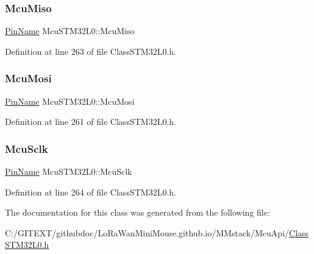 \subsubsection{\texorpdfstring{Mcu\+Miso}{McuMiso}}
{\footnotesize\ttfamily \mbox{\hyperlink{_class_s_t_m32_l0_8h_a5ceb873075d76667eb54dc6a7d2734d1}{Pin\+Name}} Mcu\+S\+T\+M32\+L0\+::\+Mcu\+Miso}



Definition at line 263 of file Class\+S\+T\+M32\+L0.\+h.

\mbox{\label{class_mcu_s_t_m32_l0_ae51c54974f7c9805c92b303a56af819d}} 
\subsubsection{\texorpdfstring{Mcu\+Mosi}{McuMosi}}
{\footnotesize\ttfamily \mbox{\hyperlink{_class_s_t_m32_l0_8h_a5ceb873075d76667eb54dc6a7d2734d1}{Pin\+Name}} Mcu\+S\+T\+M32\+L0\+::\+Mcu\+Mosi}



Definition at line 261 of file Class\+S\+T\+M32\+L0.\+h.

\mbox{\label{class_mcu_s_t_m32_l0_a4162e63da5dfca06d192ee811157be3c}} 
\subsubsection{\texorpdfstring{Mcu\+Sclk}{McuSclk}}
{\footnotesize\ttfamily \mbox{\hyperlink{_class_s_t_m32_l0_8h_a5ceb873075d76667eb54dc6a7d2734d1}{Pin\+Name}} Mcu\+S\+T\+M32\+L0\+::\+Mcu\+Sclk}



Definition at line 264 of file Class\+S\+T\+M32\+L0.\+h.



The documentation for this class was generated from the following file\+:\begin{DoxyCompactItemize}
\item 
C\+:/\+G\+I\+T\+E\+X\+T/githubdoc/\+Lo\+Ra\+Wan\+Mini\+Mouse.\+github.\+io/\+M\+Mstack/\+Mcu\+Api/\mbox{\hyperlink{_class_s_t_m32_l0_8h}{Class\+S\+T\+M32\+L0.\+h}}\end{DoxyCompactItemize}
